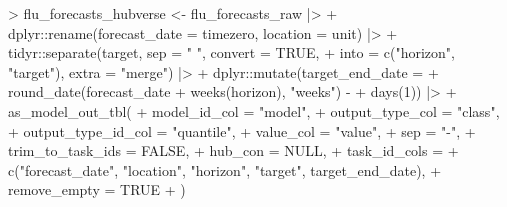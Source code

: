 \documentclass[
]{article}
\newenvironment{Shaded}{\begin{snugshade}}{\end{snugshade}}
\newcommand{\AttributeTok}[1]{\textcolor[rgb]{0.40,0.45,0.13}{#1}}
\newcommand{\ConstantTok}[1]{\textcolor[rgb]{0.56,0.35,0.01}{#1}}
\newcommand{\DecValTok}[1]{\textcolor[rgb]{0.68,0.00,0.00}{#1}}
\newcommand{\FunctionTok}[1]{\textcolor[rgb]{0.28,0.35,0.67}{#1}}
\newcommand{\NormalTok}[1]{\textcolor[rgb]{0.00,0.23,0.31}{#1}}
\newcommand{\OtherTok}[1]{\textcolor[rgb]{0.00,0.23,0.31}{#1}}
\newcommand{\SpecialCharTok}[1]{\textcolor[rgb]{0.37,0.37,0.37}{#1}}
\newcommand{\StringTok}[1]{\textcolor[rgb]{0.13,0.47,0.30}{#1}}
\begin{document}
\begin{Shaded}
\begin{Highlighting}[]
\SpecialCharTok{\textgreater{}}\NormalTok{ flu\_forecasts\_hubverse }\OtherTok{\textless{}{-}}\NormalTok{ flu\_forecasts\_raw }\SpecialCharTok{|\textgreater{}}
\SpecialCharTok{+}\NormalTok{   dplyr}\SpecialCharTok{::}\FunctionTok{rename}\NormalTok{(}\AttributeTok{forecast\_date =}\NormalTok{ timezero, }\AttributeTok{location =}\NormalTok{ unit) }\SpecialCharTok{|\textgreater{}}
\SpecialCharTok{+}\NormalTok{   tidyr}\SpecialCharTok{::}\FunctionTok{separate}\NormalTok{(target, }\AttributeTok{sep =} \StringTok{" "}\NormalTok{, }\AttributeTok{convert =} \ConstantTok{TRUE}\NormalTok{,}
\SpecialCharTok{+}                   \AttributeTok{into =} \FunctionTok{c}\NormalTok{(}\StringTok{"horizon"}\NormalTok{, }\StringTok{"target"}\NormalTok{), }\AttributeTok{extra =} \StringTok{"merge"}\NormalTok{) }\SpecialCharTok{|\textgreater{}}
\SpecialCharTok{+}\NormalTok{   dplyr}\SpecialCharTok{::}\FunctionTok{mutate}\NormalTok{(}\AttributeTok{target\_end\_date =} 
\SpecialCharTok{+}                   \FunctionTok{round\_date}\NormalTok{(forecast\_date }\SpecialCharTok{+} \FunctionTok{weeks}\NormalTok{(horizon), }\StringTok{"weeks"}\NormalTok{) }\SpecialCharTok{{-}}
\SpecialCharTok{+}                     \FunctionTok{days}\NormalTok{(}\DecValTok{1}\NormalTok{)) }\SpecialCharTok{|\textgreater{}}
\SpecialCharTok{+}   \FunctionTok{as\_model\_out\_tbl}\NormalTok{(}
\SpecialCharTok{+}     \AttributeTok{model\_id\_col =} \StringTok{"model"}\NormalTok{,}
\SpecialCharTok{+}     \AttributeTok{output\_type\_col =} \StringTok{"class"}\NormalTok{,}
\SpecialCharTok{+}     \AttributeTok{output\_type\_id\_col =} \StringTok{"quantile"}\NormalTok{,}
\SpecialCharTok{+}     \AttributeTok{value\_col =} \StringTok{"value"}\NormalTok{,}
\SpecialCharTok{+}     \AttributeTok{sep =} \StringTok{"{-}"}\NormalTok{,}
\SpecialCharTok{+}     \AttributeTok{trim\_to\_task\_ids =} \ConstantTok{FALSE}\NormalTok{,}
\SpecialCharTok{+}     \AttributeTok{hub\_con =} \ConstantTok{NULL}\NormalTok{,}
\SpecialCharTok{+}     \AttributeTok{task\_id\_cols =} 
\SpecialCharTok{+}       \FunctionTok{c}\NormalTok{(}\StringTok{"forecast\_date"}\NormalTok{, }\StringTok{"location"}\NormalTok{, }\StringTok{"horizon"}\NormalTok{, }\StringTok{"target"}\NormalTok{, target\_end\_date),}
\SpecialCharTok{+}     \AttributeTok{remove\_empty =} \ConstantTok{TRUE}
\SpecialCharTok{+}\NormalTok{   )}
\end{Highlighting}
\end{Shaded}
\end{document}
